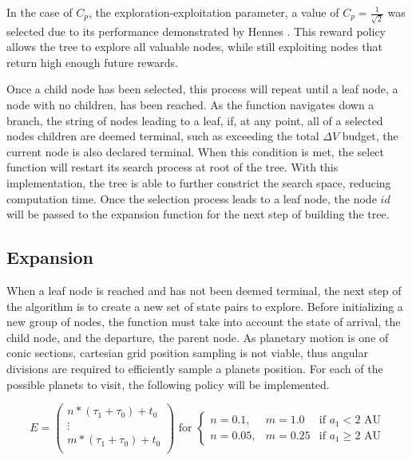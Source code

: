 \documentclass[letterpaper, preprint, paper,11pt]{AAS}	%
\begin{document}
In the case of $C_p$, the exploration-exploitation parameter, a value of $C_p = \frac{1}{\sqrt{2}}$ was selected due to its performance demonstrated by Hennes \cite{Hennes2015}. This reward policy allows the tree to explore all valuable nodes, while still exploiting nodes that return high enough future rewards.

Once a child node has been selected, this process will repeat until a leaf node, a node with no children, has been reached. As the function navigates down a branch, the string of nodes leading to a leaf, if, at any point, all of a selected nodes children are deemed terminal, such as exceeding the total $\Delta V$ budget, the current node is also declared terminal. When this condition is met, the select function will restart its search process at root of the tree. With this implementation, the tree is able to further constrict the search space, reducing computation time. Once the selection process leads to a leaf node, the node $id$ will be passed to the expansion function for the next step of building the tree. %

\subsection{Expansion}
When a leaf node is reached and has not been deemed terminal, the next step of the algorithm is to create a new set of state pairs to explore. Before initializing a new group of nodes, the function must take into account the state of arrival, the child node, and the departure, the parent node. As planetary motion is one of conic sections, cartesian grid position sampling is not viable, thus angular divisions are required to efficiently sample a planets position. For each of the possible planets to visit, the following policy will be implemented. 

\begin{equation}
    \label{eq:ephemArray}
    E = 
    \left(\begin{array}{c}
        n*(\tau_1 + \tau_0) + t_0 \\ 
        \vdots \\
        m*(\tau_1 + \tau_0) + t_0 \\
    \end{array}\right)
    \text{ for } 
    \left\{\begin{array}{lll} 
        n = 0.1, & m = 1.0 &\text{if } a_1 < 2 \text{ AU} \\ 
        n = 0.05, & m = 0.25 &\text{if } a_1 \geq 2 \text{ AU}
    \end{array}\right.
\end{equation}
\end{document}
